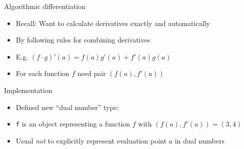 \begin{frame}{Algorithmic differentiation}
\protect\hypertarget{algorithmic-differentiation}{}

\begin{itemize}
\item
  Recall: Want to calculate derivatives exactly and automatically
\item
  By following rules for combining derivatives
\item
  E.g. \((f \cdot g)'(a) = f(a) g'(a) + f'(a) g(a)\)
\item
  For each function \(f\) need pair \((f(a), f'(a))\)
\end{itemize}

\end{frame}

\begin{frame}[fragile]{Implementation}
\protect\hypertarget{implementation}{}

\begin{itemize}
\item
  Defined new ``dual number'' type:

\begin{Shaded}
\begin{Highlighting}[]

\NormalTok{, }\NormalTok{)}
\end{Highlighting}
\end{Shaded}
\item
  \texttt{f} is an object representing a function \(f\) with
  \((f(a), f'(a)) = (3, 4)\)
\item
  Usual \emph{not} to explicitly represent evaluation point \(a\) in
  dual numbers
\end{itemize}

\end{frame}

